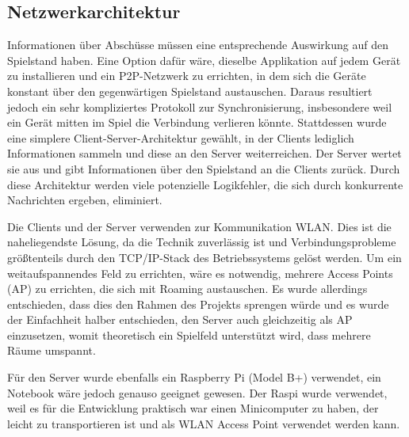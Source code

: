 \subsection{Netzwerkarchitektur}
\label{sec:architektur-netzwerkarchitektur}

Informationen über Abschüsse müssen eine entsprechende Auswirkung auf den Spielstand haben.
Eine Option dafür wäre, dieselbe Applikation auf jedem Gerät zu installieren und ein P2P-Netzwerk zu
errichten, in dem sich die Geräte konstant über den gegenwärtigen Spielstand austauschen.
Daraus resultiert jedoch ein sehr kompliziertes Protokoll zur Synchronisierung, insbesondere weil
ein Gerät mitten im Spiel die Verbindung verlieren könnte.
Stattdessen wurde eine simplere Client-Server-Architektur gewählt, in der Clients lediglich
Informationen sammeln und diese an den Server weiterreichen.
Der Server wertet sie aus und gibt Informationen über den Spielstand an die Clients zurück.
Durch diese Architektur werden viele potenzielle Logikfehler, die sich durch konkurrente Nachrichten
ergeben, eliminiert.

Die Clients und der Server verwenden zur Kommunikation WLAN. Dies ist die naheliegendste Lösung, da
die Technik zuverlässig ist und Verbindungsprobleme größtenteils durch den TCP/IP-Stack des
Betriebssystems gelöst werden.
Um ein weitaufspannendes Feld zu errichten, wäre es notwendig, mehrere Access Points (AP) zu
errichten, die sich mit Roaming austauschen.
Es wurde allerdings entschieden, dass dies den Rahmen des Projekts sprengen würde und es wurde der
Einfachheit halber entschieden, den Server auch gleichzeitig als AP einzusetzen, womit theoretisch
ein Spielfeld unterstützt wird, dass mehrere Räume umspannt.

Für den Server wurde ebenfalls ein Raspberry Pi (Model B+) verwendet, ein Notebook wäre jedoch
genauso geeignet gewesen.
Der Raspi wurde verwendet, weil es für die Entwicklung praktisch war einen Minicomputer zu haben,
der leicht zu transportieren ist und als WLAN Access Point verwendet werden kann.

